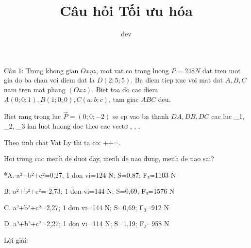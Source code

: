 \documentclass[a4paper,12pt]{article}
\begin{document}
\title{Câu hỏi Tối ưu hóa}
\author{dev}
\maketitle

Câu 1: Trong khong gian \(Oxyz\), mot vat co trong luong \(P=248N\) dat tren mot gia do ba chan voi diem dat la \(D(2; 5; 5)\). Ba diem tiep xuc voi mat dat \(A, B, C\) nam tren mat phang \((Oxz)\). Biet toa do cac diem \(A(0; 0; 1), B(1; 0; 0), C(a; b; c)\), tam giac \(ABC\) deu. 

Biet rang trong luc \(\overrightarrow{P}=(0; 0; -2)\) se ep vao ba thanh \(DA, DB, DC\) cac luc _1, _2, _3\) lan luot huong doc theo cac vectơ , , \). 

Theo tinh chat Vat Ly thi ta co: ++=\).

Hoi trong cac menh de duoi day, menh de nao dung, menh de nao sai?

*A. a²+b²+c²=0{,}27; 1 don vi=124 N; S=0{,}87; F₃=1103 N

B. a²+b²+c²=-2{,}73; 1 don vi=144 N; S=0{,}69; F₃=1576 N

C. a²+b²+c²=2{,}27; 1 don vi=144 N; S=0{,}69; F₃=912 N

D. a²+b²+c²=2{,}27; 1 don vi=114 N; S=1{,}19; F₃=958 N

Lời giải:
\end{document}
